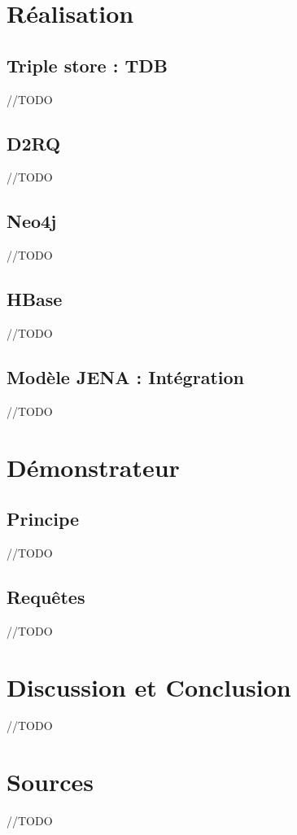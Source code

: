 \documentclass{article}
\begin{document}
\section{Réalisation}

\subsection{Triple store : TDB}
//TODO



\subsection{D2RQ}

//TODO

\subsection{Neo4j}
//TODO






\subsection{HBase}
//TODO

\subsection{Modèle JENA : Intégration}\label{sec:Jena}
//TODO



\section{Démonstrateur}

\subsection{Principe}
//TODO

\subsection{Requêtes}

//TODO


\section{Discussion et Conclusion }
//TODO


\section{Sources}

//TODO

\end{document}
